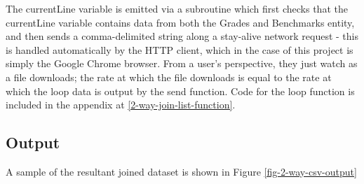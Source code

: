 The currentLine variable is emitted via a subroutine which first checks that the currentLine variable contains data from both the Grades and Benchmarks entity, and then sends a comma-delimited string along a stay-alive network request - this is handled automatically by the HTTP client, which in the case of this project is simply the Google Chrome browser. From a user's perspective, they just watch as a file downloads; the rate at which the file downloads is equal to the rate at which the loop data is output by the send function. Code for the loop function is included in the appendix at \ref{2-way-join-list-function}.

\subsection{Output}
A sample of the resultant joined dataset is shown in Figure \ref{fig-2-way-csv-output}
